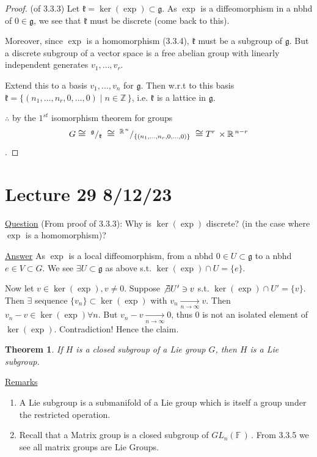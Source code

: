 \documentclass[12pt,a4paper]{article}
\newcommand{\zZ}{\ensuremath{\mathbb{Z}\,}}
\newcommand{\rR}{\ensuremath{\mathbb{R}\,}}
\newcommand{\fF}{\ensuremath{\mathbb{F}\,}}
\newcommand{\glnff}{\ensuremath{GL_n(\fF)\,}}
\newcommand{\lalg}{\ensuremath{\mathfrak{g}}}
\newcommand{\lall}[1]{\ensuremath{\mathfrak{#1}}}
\newcommand{\tor}[1]{\ensuremath{T^{#1}}\,}
\newcommand{\ul}[1]{\underline{#1}}
\newcommand{\quot}[2]{\ensuremath{\;^{#1} / _{#2}\;}}
\newtheorem{thm}{Theorem}[subsubsection]
\begin{document}
\begin{proof}
(of 3.3.3) Let $\lall{k}=\ker(\exp)\subset\lalg$. As $\exp$ is a diffeomorphism in a nbhd of $0\in \lalg$, we see that $\lall{k}$ must be discrete (come back to this).

Moreover, since $\exp$ is a homomorphism (3.3.4), $\lall{k}$ must be a subgroup of \lalg. But a discrete subgroup of a vector space is a free abelian group with linearly independent generates $v_1,\ldots, v_r$.

Extend this to a basis $v_1,\ldots, v_n$ for \lalg. Then w.r.t to this basis $\lall{k}=\{(n_1,\ldots, n_r, 0, \ldots, 0)\mid n\in \zZ\}$, i.e. \lall{k} is a lattice in \lalg.

$\therefore$ by the $1^{st}$ isomorphism theorem for groups 
\[\large G\cong \quot{\lalg}{\lall{k}}\cong \quot{\rR^n}{\{(n_1,\ldots,n_r,0,\ldots,0)\}}\cong \tor{r}\times \rR^{n-r}\].
\end{proof}

\section{Lecture 29 8/12/23}
\ul{Question} (From proof of 3.3.3): Why is $\ker(\exp)$ discrete? (in the case where $\exp$ is a homomorphism)?

\ul{Answer} As $\exp$ is a local diffeomorphism, from a nbhd $0\in U\subset \lalg$ to a nbhd $e\in V\subset G$. We see $\exists U\subset \lalg$ as above s.t. $\ker(\exp)\cap U=\{e\}$.

Now let $v\in \ker(\exp), v\neq 0$. Suppose $\not \exists U'\ni v $ s.t. $\ker(\exp)\cap U'=\{v\}$.  Then $\exists$ sequence $\{v_n\}\subset \ker(\exp)$ with $v_n \underset{n\to \infty}{\to}v$. Then $v_n-v\in \ker(\exp) \forall n$. But $v_n-v \underset{n\to \infty}{\to}0$, thus $0$ is not an isolated element of $\ker(\exp)$. Contradiction! Hence the claim.

\begin{thm}
If $H$ is a closed subgroup of a Lie group $G$, then $H$ is a Lie subgroup.
\end{thm}
\ul{Remarks} 
\begin{enumerate}
\item A Lie subgroup is a submanifold of a Lie group which is itself a group under the restricted operation.
\item Recall that a Matrix group is a closed subgroup of \glnff. From 3.3.5 we see all matrix groups are Lie Groups. 
\end{enumerate}
\end{document}
